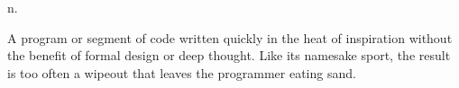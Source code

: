  n.

A program or segment of code written quickly in the heat of inspiration without
the benefit of formal design or deep thought. Like its namesake sport, the
result is too often a wipeout that leaves the programmer eating sand.

